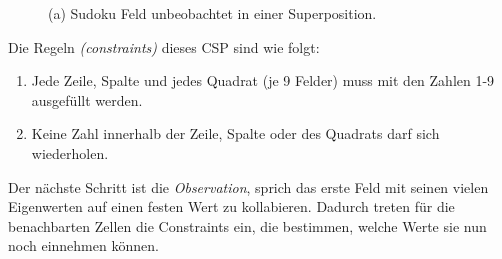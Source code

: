\documentclass[12pt, a4paper,twoside,openright]{report} %
\begin{document}
\begin{figure}[H]
    \centering
    \caption{(a) Sudoku Feld unbeobachtet in einer Superposition.}%
\end{figure}

Die Regeln \textit{(constraints)} dieses CSP sind wie folgt:
\begin{enumerate}
    \item Jede Zeile, Spalte und jedes Quadrat {(je 9 Felder)} muss mit den Zahlen 1-9 ausgefüllt werden.
    \item Keine Zahl innerhalb der Zeile, Spalte oder des Quadrats darf sich wiederholen.
\end{enumerate}

Der nächste Schritt ist die \textit{Observation}, sprich das erste Feld mit seinen vielen Eigenwerten auf einen festen Wert zu kollabieren.
Dadurch treten für die benachbarten Zellen die Constraints ein, die bestimmen, welche Werte sie nun noch einnehmen können.
\end{document}
